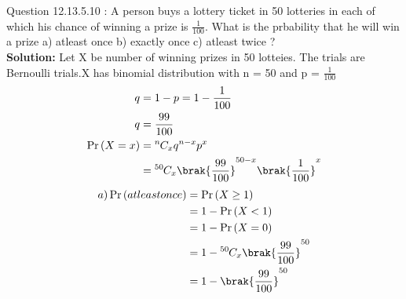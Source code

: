 \documentclass[journal,12pt,twocolumn]{IEEEtran}
\theoremstyle{remark}
\begin{document}
\newcommand{\solution}{\noindent \textbf{Solution: }}
\newcommand{\cosec}{\,\text{cosec}\,}
\providecommand{\dec}[2]{\ensuremath{\overset{#1}{\underset{#2}{\gtrless}}}}
\newcommand{\myvec}[1]{\ensuremath{\begin{pmatrix}#1\end{pmatrix}}}
\newcommand{\mydet}[1]{\ensuremath{\begin{vmatrix}#1\end{vmatrix}}}
\newcommand{\myaugvec}[2]{\ensuremath{\begin{amatrix}{#1}#2\end{amatrix}}}
\providecommand{\rank}{\text{rank}}
\providecommand{\pr}[1]{\ensuremath{\Pr\left(#1\right)}}
\providecommand{\qfunc}[1]{\ensuremath{Q\left(#1\right)}}
	\newcommand*{\permcomb}[4][0mu]{{{}^{#3}\mkern#1#2_{#4}}}
\newcommand*{\perm}[1][-3mu]{\permcomb[#1]{P}}
\newcommand*{\comb}[1][-1mu]{\permcomb[#1]{C}}
\providecommand{\qfunc}[1]{\ensuremath{Q\left(#1\right)}}
\providecommand{\gauss}[2]{\mathcal{N}\ensuremath{\left(#1,#2\right)}}
\providecommand{\diff}[2]{\ensuremath{\frac{d{#1}}{d{#2}}}}
\providecommand{\myceil}[1]{\left \lceil #1 \right \rceil }
\newcommand\figref{Fig.~\ref}
\newcommand\tabref{Table~\ref}
\newcommand{\sinc}{\,\text{sinc}\,}
\newcommand{\rect}{\,\text{rect}\,}
\let\vec\mathbf
Question 12.13.5.10 :  A person buys a lottery ticket in 50 lotteries in each of which his chance of winning a prize is $\frac{1}{100}$. What is the prbability that he will win a prize a) atleast once b) exactly once c) atleast twice ?\\
\solution Let X be number of winning prizes in 50 lotteies. The trials are Bernoulli trials.X has binomial distribution with n = 50 and p = $\frac{1}{100}$ 
\begin{align}
q &= 1 - p = 1-\frac{1}{100} \\
q &=   \frac{99}{100} \\
\pr{X = x} &= \comb{n}{x} q^{n-x}p^x \\
             &= \comb{50}{x}\brak{\frac{99}{100}}^{50-x}\brak{\frac{1}{100}}^{x}
 \end{align}
  \begin{align}
a) \pr{atleast once} &= \pr{X \geq 1} \\
  &= 1 - \pr{X < 1} \\
  &= 1 - \pr{X=0}  \\
  &= 1 - \comb{50}{x}\brak{\frac{99}{100}}^{50} \\
  &= 1 - \brak{\frac{99}{100}}^{50} 
 \end{align}
\end{document}
